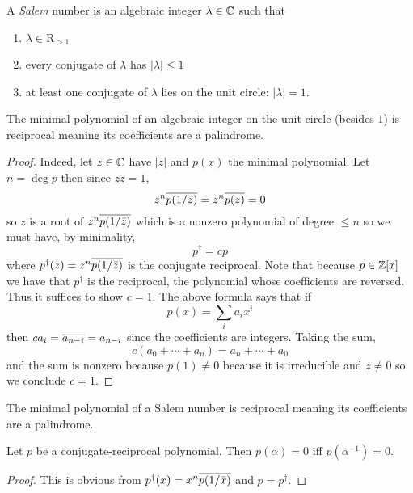\documentclass[12pt]{article}
\newcommand{\R}{\mathrm{R}}
\begin{document}
\begin{defn}
A \textit{Salem} number is an algebraic integer $\lambda \in \mathbb{C}$ such that 
\begin{enumerate}
\item $\lambda \in \R_{>1}$
\item every conjugate of $\lambda$ has $|\lambda| \le 1$
\item at least one conjugate of $\lambda$ lies on the unit circle: $|\lambda| = 1$.
\end{enumerate}
\end{defn}

\begin{prop}
The minimal polynomial of an algebraic integer on the unit circle (besides $1$) is reciprocal meaning its coefficients are a palindrome.
\end{prop}

\begin{proof}
Indeed, let $z \in \mathbb{C}$ have $|z|$ and $p(x)$ the minimal polynomial. Let $n = \deg{p}$ then since $z \bar{z} = 1$,
\[ z^n \overline{p(1/\bar{z})} = z^n \overline{p(z)} = 0 \]
so $z$ is a root of $z^n \overline{p(1/\bar{z})}$ which is a nonzero polynomial of degree $\le n$ so we must have, by minimality,
\[ p^{\dagger} = c p \]
where $p^{\dagger}(z) = z^n \overline{p(1/\bar{z})}$ is the conjugate reciprocal. Note that because $p \in \mathbb{Z}[x]$ we have that $p^{\dagger}$ is the reciprocal, the polynomial whose coefficients are reversed. Thus it suffices to show $c = 1$. The above formula says that if 
\[ p(x) = \sum_i a_i x^i \]
then $c a_i = \overline{a_{n-i}} = a_{n-i}$ since the coefficients are integers. Taking the sum,
\[ c (a_0 + \cdots + a_n) = a_n + \cdots + a_0 \]
and the sum is nonzero because $p(1) \neq 0$ because it is irreducible and $z \neq 0$ so we conclude $c = 1$.
\end{proof}

\begin{cor}
The minimal polynomial of a Salem number is reciprocal meaning its coefficients are a palindrome.
\end{cor}

\begin{lemma}
Let $p$ be a conjugate-reciprocal polynomial. Then $p(\alpha) = 0$ iff $p(\alpha^{-1}) = 0$.
\end{lemma}

\begin{proof}
This is obvious from $p^{\dagger}(x) = x^n \overline{p(1/\bar{x})}$ and $p = p^{\dagger}$.
\end{proof}
\end{document}
